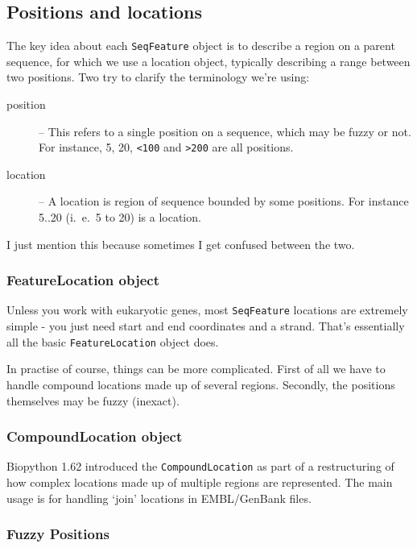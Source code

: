 \documentclass{report}
\begin{document}
\subsection{Positions and locations}
\label{sec:locations}

The key idea about each \verb|SeqFeature| object is to describe a
region on a parent sequence, for which we use a location object,
typically describing a range between two positions. Two try to
clarify the terminology we're using:

\begin{description}
  \item[position] -- This refers to a single position on a sequence,
  which may be fuzzy or not. For instance, 5, 20, \verb|<100| and
  \verb|>200| are all positions.

  \item[location] -- A location is region of sequence bounded by
  some positions. For instance 5..20 (i.~e.~5 to 20) is a location.
\end{description}

I just mention this because sometimes I get confused between the two.

\subsubsection{FeatureLocation object}

Unless you work with eukaryotic genes, most \verb|SeqFeature| locations are
extremely simple - you just need start and end coordinates and a strand.
That's essentially all the basic \verb|FeatureLocation| object does.


In practise of course, things can be more complicated. First of all
we have to handle compound locations made up of several regions.
Secondly, the positions themselves may be fuzzy (inexact).

\subsubsection{CompoundLocation object}

Biopython 1.62 introduced the \verb|CompoundLocation| as part of
a restructuring of how complex locations made up of multiple regions
are represented.
The main usage is for handling `join' locations in EMBL/GenBank files.


\subsubsection{Fuzzy Positions}
\end{document}
